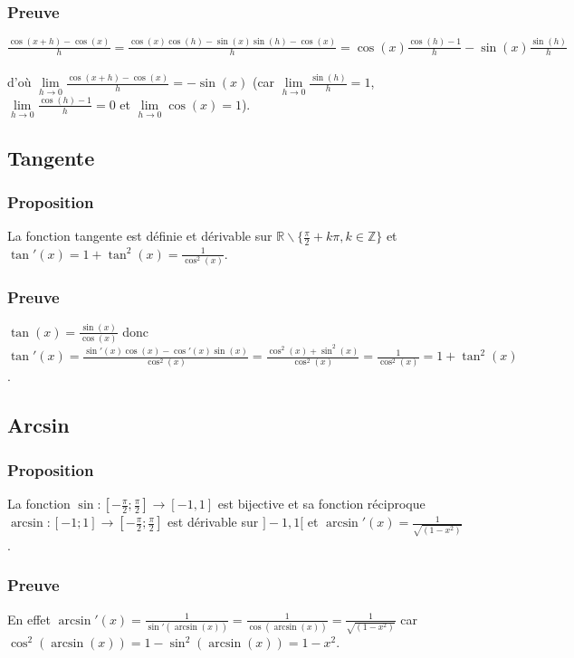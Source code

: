 \documentclass[a4paper,10pt]{book} %
\newcommand{\R}{\mathbb{R}}
\newcommand{\Z}{\mathbb{Z}}
\begin{document}
\subsubsection{Preuve}
$\frac{\cos(x+h)-\cos(x)}{h}=\frac{\cos(x)\cos(h)-\sin(x)\sin(h)-\cos(x)}{h}=\cos(x)\frac{\cos(h)-1}{h}-\sin(x)\frac{\sin(h)}{h}$\\\\
d'où $\lim\limits_{h \rightarrow 0}\frac{\cos(x+h)-\cos(x)}{h}=-\sin(x)$ (car $\lim\limits_{h\rightarrow 0}\frac{\sin(h)}{h}=1$, $\lim\limits_{h \rightarrow 0} \frac{\cos(h)-1}{h}=0$ et $\lim\limits_{h\rightarrow 0} \cos(x)=1$).

\subsection{Tangente}
\subsubsection{Proposition}
La fonction tangente est définie et dérivable sur $\R\backslash\{\frac{\pi}{2}+k\pi, k\in \Z\}$ et\\
$\tan'(x)=1+\tan^{2}(x)=\frac{1}{\cos^2 (x)}$.

\subsubsection{Preuve}
$\tan(x)=\frac{\sin(x)}{\cos(x)}$ donc $\tan'(x)=\frac{\sin'(x)\cos(x)-\cos'(x)\sin(x)}{\cos^2 (x)}=\frac{\cos^2 (x)+\sin^2 (x)}{\cos^2(x)}=\frac{1}{\cos^2 (x)}=1+ \tan^2 (x)$.

\subsection{Arcsin}
\subsubsection{Proposition}
La fonction $\sin : [-\frac{\pi}{2};\frac{\pi}{2}]\rightarrow [-1,1]$ est bijective et sa fonction réciproque\\
$\arcsin : [-1;1] \rightarrow [-\frac{\pi}{2};\frac{\pi}{2}]$ est dérivable sur $]-1,1[$ et $\arcsin'(x)=\frac{1}{\sqrt{(1-x^2)}}$.

\subsubsection{Preuve}
En effet $\arcsin'(x)=\frac{1}{\sin'(\arcsin(x))}=\frac{1}{\cos(\arcsin(x))}=\frac{1}{\sqrt{(1-x^2)}}$ car\\ $\cos^2(\arcsin(x))=1-\sin^2(\arcsin(x))=1-x^2$.
\end{document}
